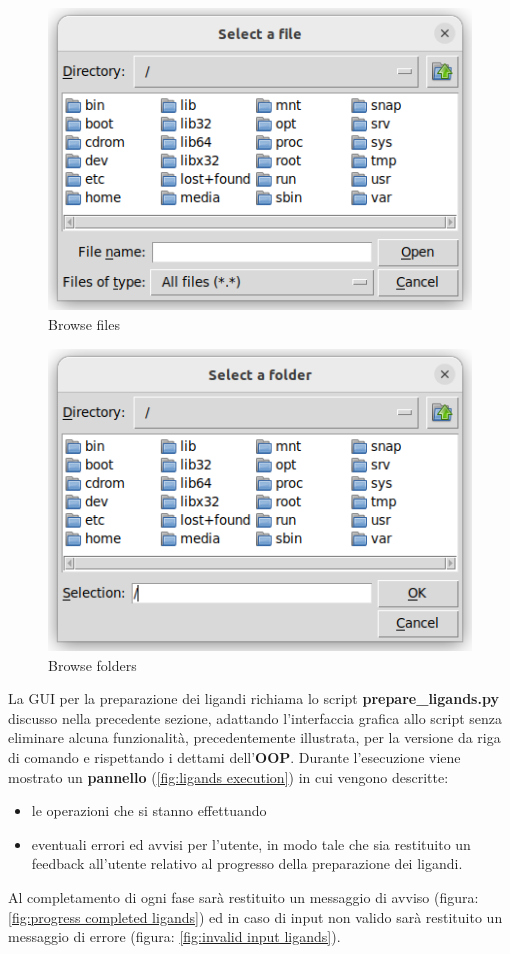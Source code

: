 \begin{figure}[H]
    \centering
    \includegraphics{immagini/capitolo3/browseFilesLigands.png}
    \caption{Browse files}
    \label{fig:browse files ligands}
\end{figure}

\begin{figure}[H]
    \centering
    \includegraphics{immagini/capitolo3/browseFoldersLigands.png}
    \caption{Browse folders}
    \label{fig:browse folders ligands}
\end{figure}

La GUI per la preparazione dei ligandi richiama lo script \textbf{prepare\_ligands.py} discusso nella precedente sezione, adattando l'interfaccia grafica allo script senza eliminare alcuna funzionalità, precedentemente illustrata, per la versione da riga di comando e rispettando i dettami dell'\textbf{OOP}.\newline
Durante l'esecuzione viene mostrato un \textbf{pannello} (\ref{fig:ligands execution}) in cui vengono descritte:
\begin{itemize}
    \item le operazioni che si stanno effettuando
    \item eventuali errori ed avvisi per l'utente, in modo tale che sia restituito un feedback all'utente relativo al progresso della preparazione dei ligandi.
\end{itemize}
Al completamento di ogni fase sarà restituito un messaggio di avviso (figura: \ref{fig:progress completed ligands}) ed in caso di input non valido sarà restituito un messaggio di errore (figura: \ref{fig:invalid input ligands}).

